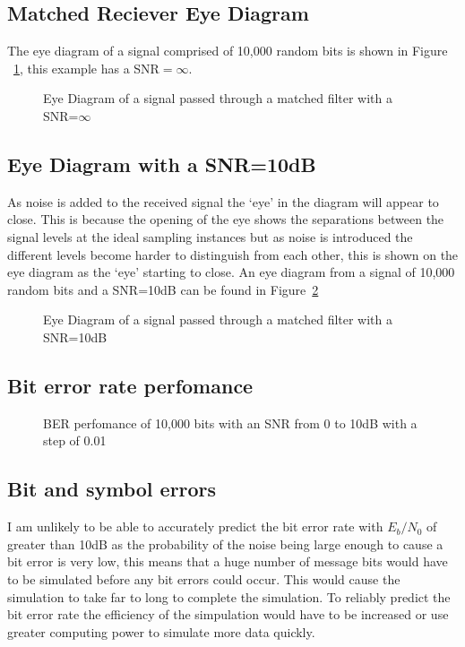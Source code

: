 \subsection{Matched Reciever Eye Diagram}

The eye diagram of a signal comprised of 10,000 random bits is shown in Figure
~\ref{fig:eye-no-noise}, this example has a SNR$=\infty$.
\begin{figure}[h]
    \begin{center}
        
    \end{center}
    \caption{Eye Diagram of a signal passed through a matched filter with a SNR=$\infty$}
    \label{fig:eye-no-noise}
\end{figure}

\subsection{Eye Diagram with a SNR=10dB}
As noise is added to the received signal the `eye' in the diagram will appear to close. 
This is because the opening of the eye shows the separations between the signal levels
at the ideal sampling instances but as noise is introduced the different levels become
harder to distinguish from each other, this is shown on the eye diagram as the `eye' 
starting to close. An eye diagram from a signal of 10,000 random bits and a SNR=10dB
can be found in Figure~\ref{fig:eye-noise}

\begin{figure}[h]
    \begin{center}
        
    \end{center}
    \caption{Eye Diagram of a signal passed through a matched filter with a SNR=10dB}
    \label{fig:eye-noise}
\end{figure}

\subsection{Bit error rate perfomance}

\begin{figure}[h]
    \begin{center}
        
    \end{center}
    \caption{BER perfomance of 10,000 bits with an SNR from 0 to 10dB with a step of 0.01}
    \label{fig:bit-error}
\end{figure}

\subsection{Bit and symbol errors}
I am unlikely to be able to accurately predict the bit error rate with $E_b/N_0$ of greater
than 10dB as the probability of the noise being large enough to cause a bit error is very
low, this means that a huge number of message bits would have to be simulated before any
bit errors could occur. This would cause the simulation to take far to long to complete
the simulation. To reliably predict the bit error rate the efficiency of the simpulation would
have to be increased or use greater computing power to simulate more data quickly.
